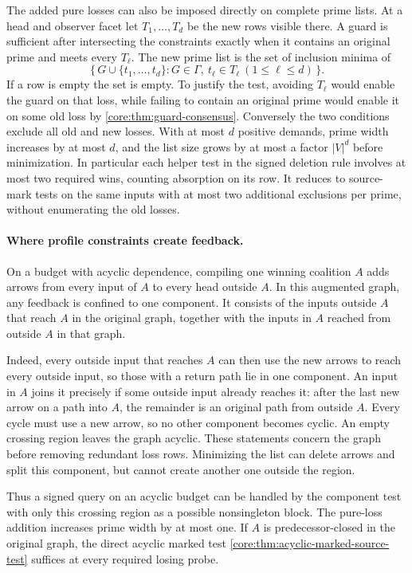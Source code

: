 The added pure losses can also be imposed directly
on complete prime lists. At a head and observer
facet let $T_1,\ldots,T_d$ be the new rows visible
there. A guard is sufficient after intersecting the
constraints exactly when it contains an original
prime and meets every $T_\ell$. The new prime list
is the set of inclusion minima of
\[
 \{\,G\cup\{t_1,\ldots,t_d\}:G\in\Gamma,\
                 t_\ell\in T_\ell\ (1\le\ell\le d)\,\}.
\]
If a row is empty the set is empty. To justify the
test, avoiding $T_\ell$ would enable the guard on
that loss, while failing to contain an original
prime would enable it on some old loss by
\cref{core:thm:guard-consensus}. Conversely the
two conditions exclude all old and new losses.
With at most $d$ positive demands, prime width
increases by at most $d$, and the list size grows
by at most a factor $|V|^d$ before minimization.
In particular each helper test in the signed
deletion rule involves at most two required wins,
counting absorption on its row. It reduces to
source-mark tests on the same inputs with at most
two additional exclusions per prime, without
enumerating the old losses.

\paragraph{Where profile constraints create feedback.}
On a budget with acyclic dependence, compiling one
winning coalition $A$ adds arrows from every input
of $A$ to every head outside $A$. In this augmented
graph, any feedback is confined to one component.
It consists of the inputs outside $A$ that reach
$A$ in the original graph, together with the inputs
in $A$ reached from outside $A$ in that graph.

Indeed, every outside input that reaches $A$ can
then use the new arrows to reach every outside
input, so those with a return path lie in one
component. An input in $A$ joins it precisely if
some outside input already reaches it: after the
last new arrow on a path into $A$, the remainder
is an original path from outside $A$. Every cycle
must use a new arrow, so no other component becomes
cyclic. An empty crossing region leaves the graph
acyclic. These statements concern the graph before
removing redundant loss rows. Minimizing the list
can delete arrows and split this component, but
cannot create another one outside the region.

Thus a signed query on an acyclic budget can be
handled by the component test with only this crossing
region as a possible nonsingleton block. The pure-loss
addition increases prime width by at most one.
If $A$ is predecessor-closed in the original graph,
the direct acyclic marked test
\cref{core:thm:acyclic-marked-source-test} suffices
at every required losing probe.


